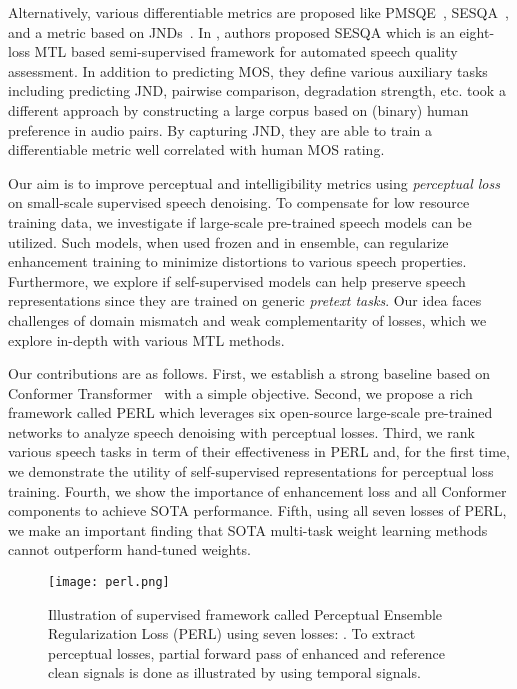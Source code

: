 \documentclass{article}
\newcommand{\squeezeup}{\vspace{-2.5mm}}
\begin{document}
Alternatively, various differentiable metrics are proposed like \ac{PMSQE}~\cite{martin2018deep}, \ac{SESQA}~\cite{serra2020sesqa}, and a metric based on \ac{JNDs}~\cite{manocha2020differentiable}.
In \cite{serra2020sesqa}, authors proposed \ac{SESQA} which is an eight-loss \ac{MTL} based semi-supervised framework for automated speech quality assessment.
In addition to predicting \ac{MOS}, they define various auxiliary tasks including predicting JND, pairwise comparison, degradation strength, etc.
\cite{manocha2020differentiable} took a different approach by constructing a large corpus based on (binary) human preference in audio pairs.
By capturing JND, they are able to train a differentiable metric well correlated with human \ac{MOS} rating.

Our aim is to improve perceptual and intelligibility metrics using \emph{perceptual loss} on small-scale supervised speech denoising.
To compensate for low resource training data, we investigate if large-scale pre-trained speech models can be utilized.
Such models, when used frozen and in ensemble, can regularize enhancement training to minimize distortions to various speech properties.
Furthermore, we explore if self-supervised models can help preserve speech representations since they are trained on generic \emph{pretext tasks}.
Our idea faces challenges of domain mismatch and weak complementarity of losses, which we explore in-depth with various \ac{MTL} methods.

Our contributions are as follows.
First, we establish a strong baseline based on Conformer Transformer~\cite{gulati2020conformer} with a simple  objective.
Second, we propose a rich framework called \ac{PERL} which leverages six open-source large-scale pre-trained networks to analyze speech denoising with perceptual losses.
Third, we rank various speech tasks in term of their effectiveness in PERL and, for the first time, we demonstrate the utility of self-supervised representations for perceptual loss training.
Fourth, we show the importance of  enhancement loss and all Conformer components to achieve \ac{SOTA} performance.
Fifth, using all seven losses of PERL, we make an important finding that \ac{SOTA} multi-task weight learning methods cannot outperform hand-tuned weights.

\begin{figure*}[ht]
    \centering
    \texttt{[image: perl.png]}
\caption{Illustration of supervised framework called Perceptual Ensemble Regularization Loss (PERL) using seven losses: . To extract perceptual losses, partial forward pass of enhanced and reference clean signals is done as illustrated by using temporal signals.}
    \squeezeup
    \label{fig:perl}
\end{figure*}
\end{document}
